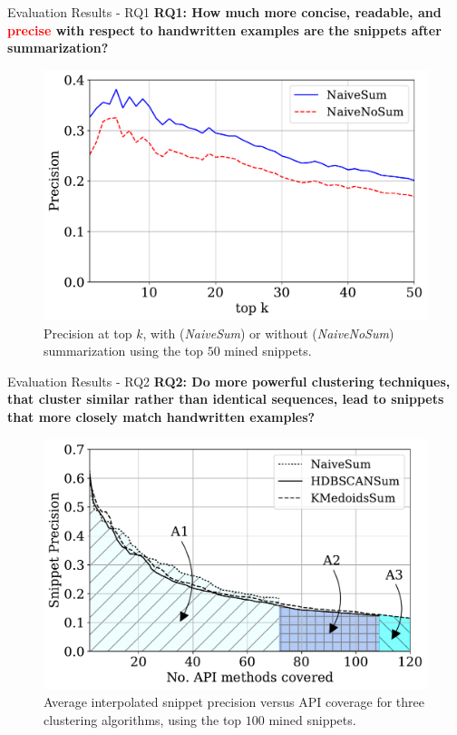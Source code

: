 \documentclass[11pt]{beamer}
\begin{document}
\begin{frame}{Evaluation Results - RQ1}
	\textbf{RQ1: How much more concise, readable, and \textcolor{red}{precise} with respect to handwritten examples are the snippets after summarization?}
	  
	\begin{figure}[ht]
		\includegraphics[scale=0.35]{images/Exp1Precision} 
		\caption[]{Precision at top $k$, with (\textit{NaiveSum}) or without (\textit{NaiveNoSum}) summarization using the top $50$ mined snippets.}
	\end{figure}
	  
\end{frame}

\begin{frame}{Evaluation Results - RQ2}
	\textbf{RQ2: Do more powerful clustering techniques, that cluster similar rather than identical sequences, lead to snippets that more closely match handwritten examples?}
	  
	\begin{figure}[ht]
		\centering
		\includegraphics[scale=0.35]{images/Exp2InterpPrecCov} 
		\caption[]{Average interpolated snippet precision versus API coverage for three clustering algorithms, using the top $100$ mined snippets.}
	\end{figure}
\end{frame}
\end{document}
